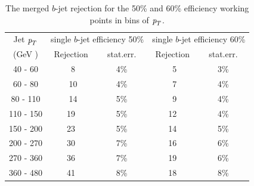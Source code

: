 

\begin{table}[!hbt] %
\renewcommand{\arraystretch}{1.2}
\centering
\begin{tabular}{ | c || c | c || c | c||}
  \hline
  Jet ${\emph{p}_{T}}$ & \multicolumn{2}{c||}{single $b$-jet efficiency 50\%} & 
            \multicolumn{2}{c||}{single $b$-jet efficiency 60\%}\\ \cline{2-5}
    (GeV )  & Rejection & ~stat.err.~ & Rejection & ~stat.err.~ \\ \hline
   40 - 60 &  ~8 &  4\%  &  ~5  &  3\%    \\ 
   60 - 80 &  ~10 &  4\%  &  ~7  &  4\%    \\ 
   80 - 110&  ~14 &  5\%  &  ~9  &  4\%    \\ 
  110 - 150&  19 &  5\%  &  12  &  4\%    \\ 
  150 - 200&  23 &  5\%  &  14  &  5\%    \\ 
  200 - 270&  30 &  7\%  &  16  &  6\%    \\ 
  270 - 360&  36 &  7\%  &  19  &  6\%    \\ 
  360 - 480&  41 &  8\%  &  18  &  8\%    \\ \hline
\end{tabular}
\caption{The merged $b$-jet rejection for the 50\% and 60\% efficiency working points in bins of ${\emph{p}_{T}}$.}
\label{tb:rejection}
\end{table}







